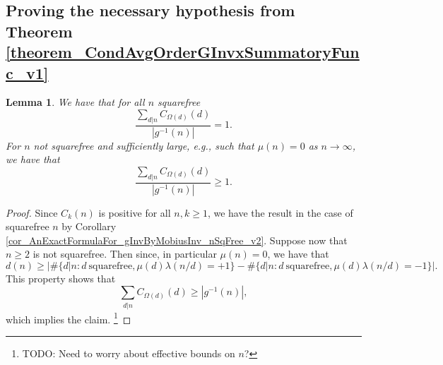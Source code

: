 \documentclass[11pt,reqno,a4letter]{article}
\numberwithin{figure}{section}
\numberwithin{table}{section}
\theoremstyle{plain}
\newtheorem{theorem}{Theorem}
\newtheorem{lemma}[theorem]{Lemma}
\newtheorem{cor}[theorem]{Corollary}
\numberwithin{theorem}{section}
\theoremstyle{definition}
\begin{document}


\subsection{Proving the necessary hypothesis from Theorem \ref{theorem_CondAvgOrderGInvxSummatoryFunc_v1}} 

\begin{lemma} 
\label{lemma_KeyPropsOfBoundsOnTheRatio_v2} 
We have that for all $n$ squarefree 
\[
\frac{\sum\limits_{d|n} C_{\Omega(d)}(d)}{|g^{-1}(n)|} = 1. 
\]
For $n$ not squarefree and sufficiently large, e.g., such that $\mu(n) = 0$ as 
$n \rightarrow \infty$, we have that 
\[
\frac{\sum\limits_{d|n} C_{\Omega(d)}(d)}{|g^{-1}(n)|} \geq 1. 
\]
\end{lemma}
\begin{proof} 
Since $C_k(n)$ is positive for all $n, k \geq 1$, we have the result in the case of 
squarefree $n$ by Corollary \ref{cor_AnExactFormulaFor_gInvByMobiusInv_nSqFree_v2}. 
Suppose now that $n \geq 2$ is not squarefree. Then since, in particular $\mu(n) = 0$, 
we have that 
\[
d(n) \geq \left\lvert \#\{d|n: d \mathrm{\ squarefree}, \mu(d)\lambda(n/d) = +1\} - 
     \#\{d|n: d \mathrm{\ squarefree}, \mu(d)\lambda(n/d) = -1\} \right\rvert. 
\]
This property shows that 
\[
\sum_{d|n} C_{\Omega(d)}(d) \geq |g^{-1}(n)|, 
\]
which implies the claim. \footnote{ 
     TODO: Need to worry about effective bounds on $n$? 
}
\end{proof} 
\end{document}
